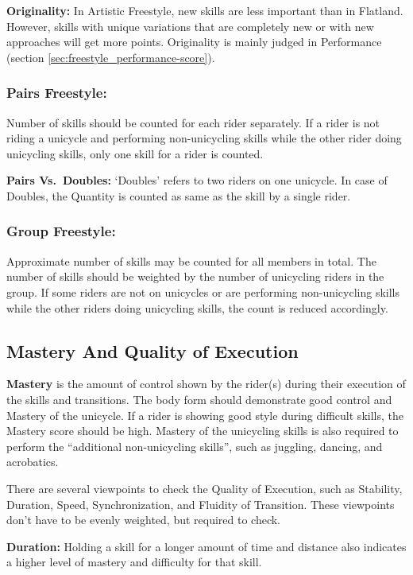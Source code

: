 \textbf{Originality:} In Artistic Freestyle, new skills are less important than in Flatland.%
However, skills with unique variations that are completely new or with new approaches will get more points.
Originality is mainly judged in Performance (section \ref{sec:freestyle_performance-score}).

\subsubsection{Pairs Freestyle:}
Number of skills should be counted for each rider separately.
If a rider is not riding a unicycle and performing non-unicycling skills while the other rider doing unicycling skills, only one skill for a rider is counted.

\textbf{Pairs Vs.\ Doubles:} `Doubles' refers to two riders on one unicycle.
In case of Doubles, the Quantity is counted as same as the skill by a single rider.

\subsubsection{Group Freestyle:}
Approximate number of skills may be counted for all members in total.
The number of skills should be weighted by the number of unicycling riders in the group.
If some riders are not on unicycles or are performing non-unicycling skills while the other riders doing unicycling skills, the count is reduced accordingly.

\subsection{Mastery And Quality of Execution}
\textbf{Mastery} is the amount of control shown by the rider(s) during their execution of the skills and transitions.
The body form should demonstrate good control and Mastery of the unicycle.
If a rider is showing good style during difficult skills, the Mastery score should be high.
Mastery of the unicycling skills is also required to perform the ``additional non-unicycling skills'', such as juggling, dancing, and acrobatics.

There are several viewpoints to check the Quality of Execution, such as Stability, Duration, Speed, Synchronization, and Fluidity of Transition.
These viewpoints don't have to be evenly weighted, but required to check.

\textbf{Duration:} Holding a skill for a longer amount of time and distance also indicates a higher level of mastery and difficulty for that skill.

